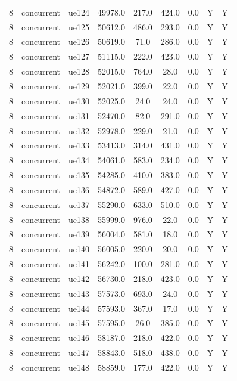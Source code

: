 \begin{table}[ht]
\begin{tabular}{|c|c|c|c|c|c|c|c|c|}
8 & concurrent & ue124 & 49978.0 & 217.0 & 424.0 & 0.0 & Y & Y \\
8 & concurrent & ue125 & 50612.0 & 486.0 & 293.0 & 0.0 & Y & Y \\
8 & concurrent & ue126 & 50619.0 & 71.0 & 286.0 & 0.0 & Y & Y \\
8 & concurrent & ue127 & 51115.0 & 222.0 & 423.0 & 0.0 & Y & Y \\
8 & concurrent & ue128 & 52015.0 & 764.0 & 28.0 & 0.0 & Y & Y \\
8 & concurrent & ue129 & 52021.0 & 399.0 & 22.0 & 0.0 & Y & Y \\
8 & concurrent & ue130 & 52025.0 & 24.0 & 24.0 & 0.0 & Y & Y \\
8 & concurrent & ue131 & 52470.0 & 82.0 & 291.0 & 0.0 & Y & Y \\
8 & concurrent & ue132 & 52978.0 & 229.0 & 21.0 & 0.0 & Y & Y \\
8 & concurrent & ue133 & 53413.0 & 314.0 & 431.0 & 0.0 & Y & Y \\
8 & concurrent & ue134 & 54061.0 & 583.0 & 234.0 & 0.0 & Y & Y \\
8 & concurrent & ue135 & 54285.0 & 410.0 & 383.0 & 0.0 & Y & Y \\
8 & concurrent & ue136 & 54872.0 & 589.0 & 427.0 & 0.0 & Y & Y \\
8 & concurrent & ue137 & 55290.0 & 633.0 & 510.0 & 0.0 & Y & Y \\
8 & concurrent & ue138 & 55999.0 & 976.0 & 22.0 & 0.0 & Y & Y \\
8 & concurrent & ue139 & 56004.0 & 581.0 & 18.0 & 0.0 & Y & Y \\
8 & concurrent & ue140 & 56005.0 & 220.0 & 20.0 & 0.0 & Y & Y \\
8 & concurrent & ue141 & 56242.0 & 100.0 & 281.0 & 0.0 & Y & Y \\
8 & concurrent & ue142 & 56730.0 & 218.0 & 423.0 & 0.0 & Y & Y \\
8 & concurrent & ue143 & 57573.0 & 693.0 & 24.0 & 0.0 & Y & Y \\
8 & concurrent & ue144 & 57593.0 & 367.0 & 17.0 & 0.0 & Y & Y \\
8 & concurrent & ue145 & 57595.0 & 26.0 & 385.0 & 0.0 & Y & Y \\
8 & concurrent & ue146 & 58187.0 & 218.0 & 422.0 & 0.0 & Y & Y \\
8 & concurrent & ue147 & 58843.0 & 518.0 & 438.0 & 0.0 & Y & Y \\
8 & concurrent & ue148 & 58859.0 & 177.0 & 422.0 & 0.0 & Y & Y \\

\end{tabular}
\end{table}
